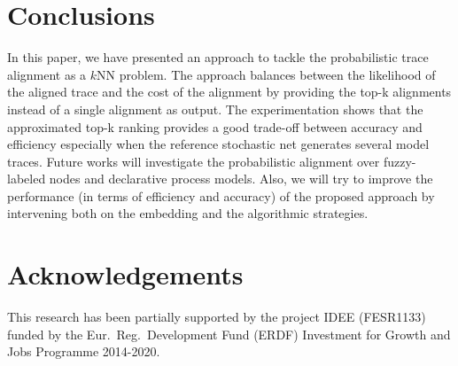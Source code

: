 \section{Conclusions}
\label{sec:conclusion}

In this paper, we have presented an approach to tackle the probabilistic trace alignment as a $k$NN problem.
The approach balances between the likelihood of the aligned trace and the cost of the alignment by providing the top-k alignments instead of a single alignment as output. The experimentation shows that the approximated top-k ranking provides a good trade-off between accuracy and efficiency especially when the reference stochastic net generates several model traces.
Future works will investigate the probabilistic alignment over fuzzy-labeled nodes and declarative process models. Also, we will try to improve the performance (in terms of efficiency and accuracy) of the proposed approach by intervening both on the embedding and the algorithmic strategies.


%
%


\section*{Acknowledgements}
This research has been partially supported by the project IDEE (FESR1133) funded by the Eur.\ Reg.\ Development Fund (ERDF) Investment for Growth and Jobs Programme 2014-2020. 